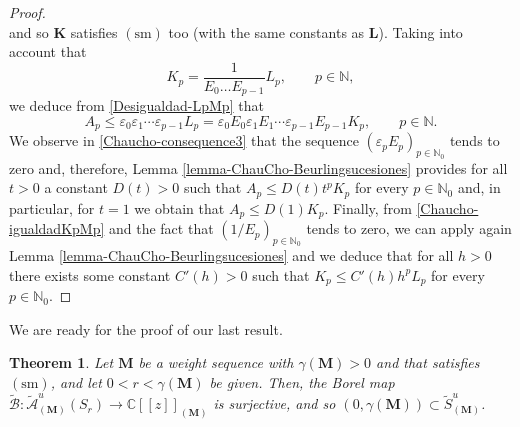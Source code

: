 \documentclass[11pt,a4paper]{article}
\theoremstyle{plain}
\newtheorem{theorem}{Theorem}[section]
\theoremstyle{definition}
\numberwithin{equation}{section}
\newcommand{\N}{\mathbb{N}}
\newcommand{\C}{\mathbb{C}}
\newcommand{\M}{{\boldsymbol{M}}}
\newcommand{\LL}{{\boldsymbol{L}}}
\def\ga{\gamma}
\newcommand{\sm}{\operatorname{(sm)}}
\begin{document}
\begin{proof}
$$$$
and so $\boldsymbol{K}$ satisfies $\sm$ too (with the same constants as $\LL$).
Taking into account that
\begin{equation}\label{Chaucho-igualdadKpMp}
	K_p=\frac{1}{E_0\dots E_{p-1}}L_p, \qquad p\in\N,
\end{equation}
we deduce from \eqref{Desigualdad-LpMp} that
\begin{equation*}
	A_p\leq \varepsilon_0\varepsilon_1\cdots \varepsilon_{p-1} L_p=\varepsilon_0E_0\varepsilon_1E_1\cdots \varepsilon_{p-1}E_{p-1}K_p,\qquad p\in\N.
\end{equation*}
We observe in \eqref{Chaucho-consequence3} that the sequence $(\varepsilon_pE_p)_{p\in\N_0}$ tends to zero and, therefore, Lemma \ref{lemma-ChauCho-Beurlingsucesiones} provides for all $t>0$ a constant $D(t)>0$ such that
$A_p\leq D(t)t^pK_p$ for every $p\in \N_0$ and, in particular, for $t=1$ we obtain that $A_p\leq D(1)K_p$.
Finally, from \eqref{Chaucho-igualdadKpMp} and the fact that $(1/E_p)_{p\in\N_0}$ tends to zero, we can apply again Lemma \ref{lemma-ChauCho-Beurlingsucesiones} and we deduce that for all $h>0$ there exists some constant $C'(h)>0$ such that
$K_p\leq C'(h)h^pL_p$ for every $p\in \N_0$.
\end{proof}

We are ready for the proof of our last result.

\begin{theorem}\label{Thilliez-Beurlingcase}
Let $\M$ be a weight sequence with $\ga(\M)>0$ and that satisfies $\sm$, and let $0<r<\ga(\M)$ be given.
	Then, the Borel map $\widetilde{\mathcal{B}}\colon \widetilde{\mathcal{A}}^u_{(\M)}(S_{r})\to\C[[z]]_{(\M)}$ is surjective, and so $(0,\ga(\M))\subset\widetilde{S}_{(\M)}^u$.
\end{theorem}
\end{document}
